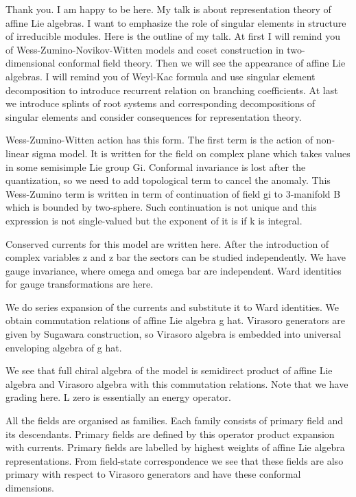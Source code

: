 \documentclass[a4paper]{article}
\begin{document}
Thank you. I am happy to be here. My talk is about representation theory of affine Lie algebras. I want to emphasize the role of singular elements in structure of irreducible modules. Here is the outline of my talk. At first I will remind you of Wess-Zumino-Novikov-Witten models and coset construction in two-dimensional conformal field theory. Then we will see the appearance of affine Lie algebras. I will remind you of Weyl-Kac formula and use singular element decomposition to introduce recurrent relation on branching coefficients. At last we introduce splints of root  systems and corresponding decompositions of singular elements and consider consequences for representation theory. 

Wess-Zumino-Witten action has this form. The first term is the action of non-linear sigma model. It is written for the field on complex plane which takes values in some semisimple Lie group Gi. Conformal invariance is lost after the quantization, so we need to add topological term to cancel the anomaly. This Wess-Zumino term is written in term of continuation of field gi to 3-manifold B which is bounded by two-sphere. Such continuation is not unique and this expression is not single-valued but the exponent of it is if k is integral. 

Conserved currents for this model are written here. After the introduction of complex variables z and z bar the sectors can be studied independently. We have gauge invariance, where omega and omega bar are independent. Ward identities for gauge transformations are here. 

We do series expansion of the currents and substitute it to Ward identities. We obtain commutation relations of affine Lie algebra g hat. 
Virasoro generators are given by Sugawara construction, so Virasoro algebra is embedded into universal enveloping algebra of g hat. 

We see that full chiral algebra of the model is semidirect product of affine Lie algebra and Virasoro algebra with this commutation relations. 
Note that we have grading here. L zero is essentially an energy operator. 

All the fields are organised as families. Each family consists of primary field and its descendants. Primary fields are defined by this operator product expansion with currents. Primary fields are labelled by highest weights of affine Lie algebra representations. From field-state correspondence we see that these fields are also primary with respect to Virasoro generators and have these conformal dimensions. 
\end{document}
